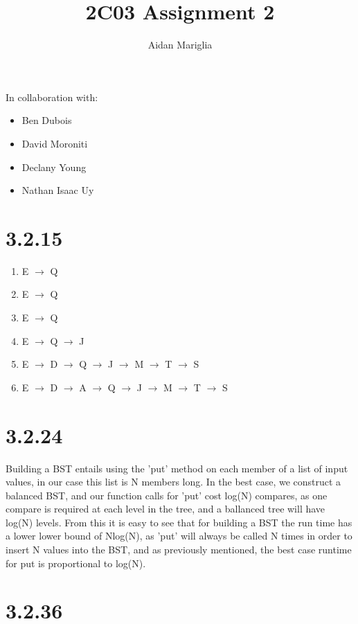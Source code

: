 \documentclass[12pt]{article}
\title{2C03 Assignment 2}
\author{Aidan Mariglia}
\begin{document}
\maketitle

In collaboration with:
\begin{itemize}[noitemsep]
    \item Ben Dubois
    \item David Moroniti
    \item Declany Young
    \item Nathan Isaac Uy
\end{itemize}
\section*{3.2.15}

\begin{enumerate}[label=(\alph*)]
\item E $\rightarrow$ Q
\item E $\rightarrow$ Q
\item E $\rightarrow$ Q
\item E $\rightarrow$ Q $\rightarrow$ J
\item E $\rightarrow$ D $\rightarrow$ Q $\rightarrow$ J $\rightarrow$ M $\rightarrow$ T $\rightarrow$ S
\item E $\rightarrow$ D $\rightarrow$ A $\rightarrow$ Q $\rightarrow$ J $\rightarrow$ M $\rightarrow$ T $\rightarrow$ S
\end{enumerate}

\section*{3.2.24}

Building a BST entails using the 'put' method on each member of
a list of input values, in our case this list is N members long.
In the best case, we construct a balanced BST, and our function calls
for 'put' cost log(N) compares, as one compare is required at each level in
the tree, and a ballanced tree will have log(N) levels. From this it is easy to see 
that for building a BST the run time has a lower lower bound of Nlog(N), 
as 'put' will always be called N times in order to insert N values 
into the BST, and as previously mentioned, the best case runtime for put is 
proportional to log(N).

\section*{3.2.36}
\end{document}
